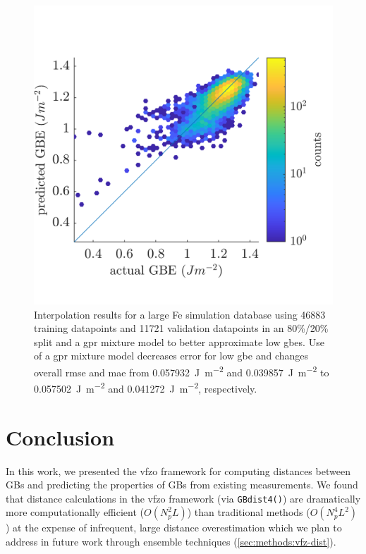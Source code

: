 \documentclass[final,twocolumn,12pt]{elsarticle}
\newcommand{\distfn}{GBdist4}
\begin{document}
\begin{figure}
    \centering
    \includegraphics{kim-interp.png}
    \caption{Interpolation results for a large Fe simulation database \cite{kimPhasefieldModeling3D2014} using \num{46883} training datapoints and \num{11721} validation datapoints in an 80\%/20\% split and a \gls{gpr} mixture model to better approximate low \glspl{gbe}. Use of a \gls{gpr} mixture model decreases error for low \gls{gbe} and changes overall \gls{rmse} and \gls{mae} from \SI{0.057932}{\J\per\square\meter} and \SI{0.039857}{\J\per\square\meter} to \SI{0.057502}{\J\per\square\meter} and \SI{0.041272}{\J\per\square\meter}, respectively.}
    \label{fig:kim-interp}
\end{figure}


\section{Conclusion} \label{sec:conclusion}

In this work, we presented the \gls{vfzo} framework for computing distances between GBs and predicting the properties of GBs from existing measurements. We found that distance calculations in the \gls{vfzo} framework (via \texttt{\distfn{}()}) are dramatically more computationally efficient ($O(N_p^2L)$) than traditional methods ($O(N_p^4L^2)$) at the expense of infrequent, large distance overestimation which we plan to address in future work through ensemble techniques (\cref{sec:methods:vfz-dist}).
\end{document}
